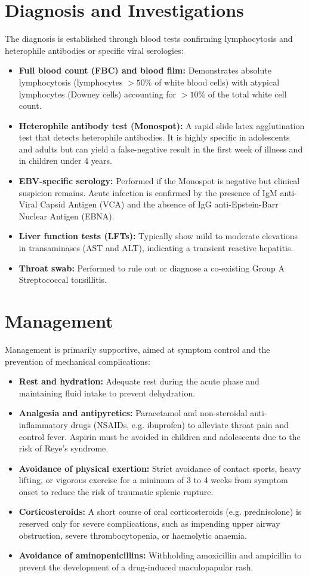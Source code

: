 \section*{Diagnosis and Investigations}
The diagnosis is established through blood tests confirming lymphocytosis and heterophile antibodies or specific viral serologies:
\begin{itemize}
    \item \textbf{Full blood count (FBC) and blood film:} Demonstrates absolute lymphocytosis (lymphocytes $>50\%$ of white blood cells) with atypical lymphocytes (Downey cells) accounting for $>10\%$ of the total white cell count.
    \item \textbf{Heterophile antibody test (Monospot):} A rapid slide latex agglutination test that detects heterophile antibodies. It is highly specific in adolescents and adults but can yield a false-negative result in the first week of illness and in children under 4 years.
    \item \textbf{EBV-specific serology:} Performed if the Monospot is negative but clinical suspicion remains. Acute infection is confirmed by the presence of IgM anti-Viral Capsid Antigen (VCA) and the absence of IgG anti-Epstein-Barr Nuclear Antigen (EBNA).
    \item \textbf{Liver function tests (LFTs):} Typically show mild to moderate elevations in transaminases (AST and ALT), indicating a transient reactive hepatitis.
    \item \textbf{Throat swab:} Performed to rule out or diagnose a co-existing Group A Streptococcal tonsillitis.
\end{itemize}

\section*{Management}
Management is primarily supportive, aimed at symptom control and the prevention of mechanical complications:
\begin{itemize}
    \item \textbf{Rest and hydration:} Adequate rest during the acute phase and maintaining fluid intake to prevent dehydration.
    \item \textbf{Analgesia and antipyretics:} Paracetamol and non-steroidal anti-inflammatory drugs (NSAIDs, e.g. ibuprofen) to alleviate throat pain and control fever. Aspirin must be avoided in children and adolescents due to the risk of Reye's syndrome.
    \item \textbf{Avoidance of physical exertion:} Strict avoidance of contact sports, heavy lifting, or vigorous exercise for a minimum of 3 to 4 weeks from symptom onset to reduce the risk of traumatic splenic rupture.
    \item \textbf{Corticosteroids:} A short course of oral corticosteroids (e.g. prednisolone) is reserved only for severe complications, such as impending upper airway obstruction, severe thrombocytopenia, or haemolytic anaemia.
    \item \textbf{Avoidance of aminopenicillins:} Withholding amoxicillin and ampicillin to prevent the development of a drug-induced maculopapular rash.
\end{itemize}

